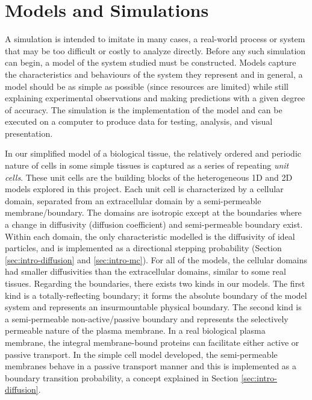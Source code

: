 \chapter{Models and Simulations}
\label{chapter:mods-sims}
	
	A simulation is intended to imitate in many cases, a real-world process or system that may be too difficult or costly to analyze directly. Before any such simulation can begin, a model of the system studied must be constructed. Models capture the characteristics and behaviours of the system they represent and in general, a model should be as simple as possible (since resources are limited) while still explaining experimental observations and making predictions with a given degree of accuracy. The simulation is the implementation of the model and can be executed on a computer to produce data for testing, analysis, and visual presentation.

	In our simplified model of a biological tissue, the relatively ordered and periodic nature of cells in some simple tissues is captured as a series of repeating \textsl{unit cells}. These unit cells are the building blocks of the heterogeneous 1D and 2D models explored in this project. Each unit cell is characterized by a cellular domain, separated from an extracellular domain by a semi-permeable membrane/boundary. The domains are isotropic except at the boundaries where a change in diffusivity (diffusion coefficient) and semi-permeable boundary exist. Within each domain, the only characteristic modelled is the diffusivity of ideal particles, and is implemented as a directional stepping probability (Section \ref{sec:intro-diffusion} and \ref{sec:intro-mc}). For all of the models, the cellular domains had smaller diffusivities than the extracellular domains, similar to some real tissues. Regarding the boundaries, there exists two kinds in our models. The first kind is a totally-reflecting boundary; it forms the absolute boundary of the model system and represents an insurmountable physical boundary. The second kind is a semi-permeable non-active/passive boundary and represents the selectively permeable nature of the plasma membrane. In a real biological plasma membrane, the integral membrane-bound proteins can facilitate either active or passive transport. In the simple cell model developed, the semi-permeable membranes behave in a passive transport manner and this is implemented as a boundary transition probability, a concept explained in Section \ref{sec:intro-diffusion}.
	
